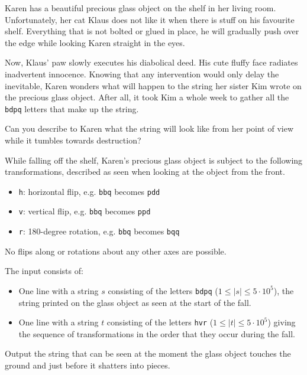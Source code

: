 \problemname{}

%
Karen has a beautiful precious glass object on the shelf in her living room.
Unfortunately, her cat Klaus does not like it when there is stuff on his favourite shelf.
Everything that is not bolted or glued in place, he will gradually push over the edge while looking Karen straight in the eyes.

Now, Klaus' paw slowly executes his diabolical deed. 
His cute fluffy face radiates inadvertent innocence.
Knowing that any intervention would only delay the inevitable, Karen wonders what will happen to the string her sister Kim wrote on the precious glass object.
After all, it took Kim a whole week to gather all the \texttt{bdpq} letters that make up the string.

Can you describe to Karen what the string will look like from her point of view while it tumbles towards destruction?

While falling off the shelf, Karen's precious glass object is subject to the following transformations, described as seen when looking at the object from the front.

\begin{itemize}
  \item \texttt{h}: horizontal flip, e.g. \texttt{bbq} becomes \texttt{pdd}
  \item \texttt{v}: vertical flip, e.g. \texttt{bbq} becomes \texttt{ppd}
  \item \texttt{r}: 180-degree rotation, e.g. \texttt{bbq} becomes \texttt{bqq}
\end{itemize}

No flips along or rotations about any other axes are possible.

\begin{Input}
  The input consists of:
  \begin{itemize}
    \item One line with a string $s$ consisting of the letters \texttt{bdpq} ($1 \le |s| \le 5\cdot 10^5$), the string printed on the glass object as seen at the start of the fall.
    \item One line with a string $t$ consisting of the letters \texttt{hvr}  ($1 \le |t| \le 5\cdot 10^5$) giving the sequence of transformations in the order that they occur during the fall.
  \end{itemize}
\end{Input}

\begin{Output}
  Output the string that can be seen at the moment the glass object touches the ground and just before it shatters into pieces.
\end{Output}
